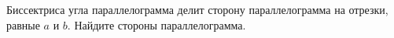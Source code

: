 \begin{ex}
	\begin{condition}
		Биссектриса угла параллелограмма делит сторону параллелограмма на отрезки, равные \( a \) и \( b \). Найдите стороны параллелограмма.
	\end{condition}
\end{ex}